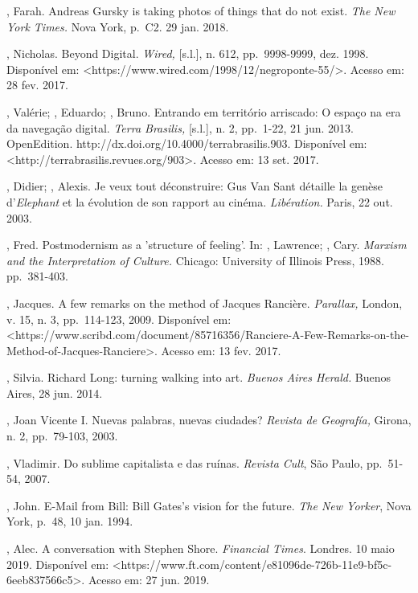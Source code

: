 \begin{Parskip}
, Farah. Andreas Gursky is taking photos of things that do not
exist. \emph{The New York Times.} Nova York, p.~C2. 29 jan. 2018.

, Nicholas. Beyond Digital. \emph{Wired,} {[}s.l.{]}, n.
612, pp.~9998-9999, dez. 1998. Disponível em:
\textless{}https://www.wired.com/1998/12/negroponte-55/\textgreater{}.
Acesso em: 28 fev. 2017.

, Valérie; , Eduardo; , Bruno. Entrando em
território arriscado: O espaço na era da navegação digital.
\emph{Terra Brasilis,} {[}s.l.{]}, n. 2, pp.~1-22, 21 jun. 2013.
OpenEdition. http://dx.doi.org/10.4000/terrabrasilis.903. Disponível em:
\textless{}http://terrabrasilis.revues.org/903\textgreater{}. Acesso em:
13 set. 2017.

, Didier; , Alexis. Je veux tout déconstruire: Gus Van Sant
détaille la genèse d'\emph{Elephant} et la évolution de son rapport au
cinéma. \emph{Libération.} Paris, 22 out. 2003.

, Fred. Postmodernism as a 'structure of feeling'. In: ,
Lawrence; , Cary. \emph{Marxism and the Interpretation of
Culture.} Chicago: University of Illinois Press, 1988. pp.~381-403.

, Jacques. A few remarks on the method of Jacques Rancière.
\emph{Parallax,} London, v. 15, n. 3, pp.~114-123, 2009. Disponível em:
\textless{}https://www.scribd.com/document/85716356/Ranciere-A-Few-Remarks-on-the-Method-of-Jacques-Ranciere\textgreater{}.
Acesso em: 13 fev. 2017.

, Silvia. Richard Long: turning walking into art.
\emph{Buenos Aires Herald.} Buenos Aires, 28 jun. 2014.

, Joan Vicente I. Nuevas palabras, nuevas ciudades? \emph{Revista
de Geografía,} Girona, n. 2, pp.~79-103, 2003.

, Vladimir. Do sublime capitalista e das ruínas. \emph{Revista
Cult}, São Paulo, pp.~51-54, 2007.

, John. E-Mail from Bill: Bill Gates's vision for the future.
\emph{The New Yorker}, Nova York, p.~48, 10 jan. 1994.

, Alec. A conversation with Stephen Shore. \emph{Financial Times}.
Londres. 10 maio 2019. Disponível em:
\textless{}https://www.ft.com/content/e81096de-726b-11e9-bf5c-6eeb837566c5\textgreater{}.
Acesso em: 27 jun. 2019.


\end{Parskip}
